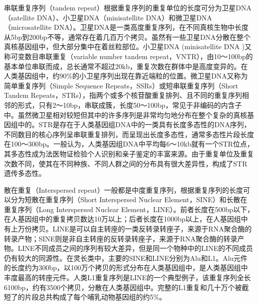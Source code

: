 \documentclass[11pt,a4paper,twoside]{book}
\begin{document}
串联重复序列（tandem repeat）根据重复序列的重复单位的长度可分为卫星DNA（satellite DNA）、小卫星DNA（minisatellite DNA）和微卫星DNA（microsatellite DNA）。卫星DNA是一类高度重复序列，在不同真核生物中长度从5bp到200bp不等，通常存在着几百万个拷贝。虽然有一些卫星DNA分散在整个真核基因组中，但大部分集中在着丝粒部位。小卫星DNA (minisatellite DNA )又称可变数目串联重复（variable number tandem repeat，VNTR），由10～100bp的基本单位串联而成，总长通常不超过20kb，重复次数在群体中是高度变异的。在人类基因组中，约90\%的小卫星序列出现在靠近端粒的位置。微卫星DNA又称为简单重复序列（Simple Sequence Repeats，SSRs）或短串联重复序列（Short Tandem Repeats，STRs），指两个或多个核苷酸重复排列、且不同的重复序列相邻的形式，只有2～10bp，串联成簇，长度50～100bp，常见于非编码的内含子中。虽然微卫星相对较短但其中的许多序列是非常均匀地分布在整个复杂的真核基因组中的。STR是存在于人类基因组DNA中的一类具有长度多态性的DNA序列，不同数目的核心序列呈串联重复排列，而呈现出长度多态性，通常多态性片段长度在100～300bp。一般认为，人类基因组DNA中平均每6～10kb就有一个STR位点，其多态性成为法医物证检验个人识别和亲子鉴定的丰富来源。由于重复单位及重复次数不同，使其在不同种族、不同人群之间的分布具有很大差异性，构成了STR遗传多态性。

散在重复（Interspersed repeat）一般都是中度重复序列，根据重复序列的长度可以分为短散在重复序列（Short Interspersed Nuclear Element，SINE）和长散在重复序列（Long Interspersed Nuclear Element，LINE）。前者长度在500bp以下，在人基因组中的重复拷贝数达10万以上；后者长度在1000bp以上，在人基因组中有上万份拷贝。LINE是可以自主转座的一类反转录转座子，来源于RNA聚合酶的转录产物；SINE则是非自主转座的反转录转座子，来源于RNA聚合酶的转录产物。LINE不同成员之间的序列有较大差异，但是同一个物种中的LINE的不同成员仍有较大的同源性。在灵长类中，主要的SINE和LINE分别为Alu和L1。Alu元件的长度约为300bp，以100万个拷贝的形式分布在人类基因组中，是人类基因组中丰度最高的转座元件。人类L1重复序列是LINE的一个典型例子，该重复序列全长6100bp，约有3500个拷贝，分散在人类基因组中。完整的L1重复和几十万个被截短了的片段总共构成了每个哺乳动物基因组的约5\%。
\end{document}
